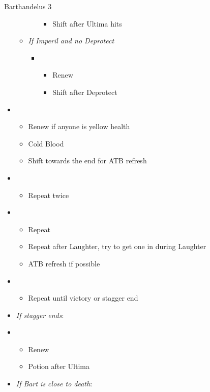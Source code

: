 \begin{battle}{Barthandelus 3}
\begin{multicols}{2}
\begin{itemize}
\begin{itemize}
\begin{itemize}
\begin{itemize}
                \item Shift after Ultima hits
            \end{itemize}
        \end{itemize}
        \item \textit{If Imperil and no Deprotect}
        \begin{itemize}
            \item \fifth
            \begin{itemize}
                \item Renew
                \item Shift after Deprotect
            \end{itemize}
        \end{itemize}
    \end{itemize}
    \item \sixth
    \begin{itemize}
        \item Renew if anyone is yellow health
        \item Cold Blood
        \item Shift towards the end for ATB refresh
    \end{itemize}
    \item \second
    \begin{itemize}
        \item Repeat twice
    \end{itemize}
    \item \first
    \begin{itemize}
        \item Repeat
        \item Repeat after Laughter, try to get one in during Laughter
        \item ATB refresh if possible
    \end{itemize}
    \item \second
    \begin{itemize}
        \item Repeat until victory or stagger end
    \end{itemize}
    \columnbreak
    \item \textit{If stagger ends}:
    \item \third
    \begin{itemize}
        \item Renew
        \item Potion after Ultima
    \end{itemize}
    \item \textit{If Bart is close to death}:

\end{itemize}
\end{multicols}
\end{battle}
